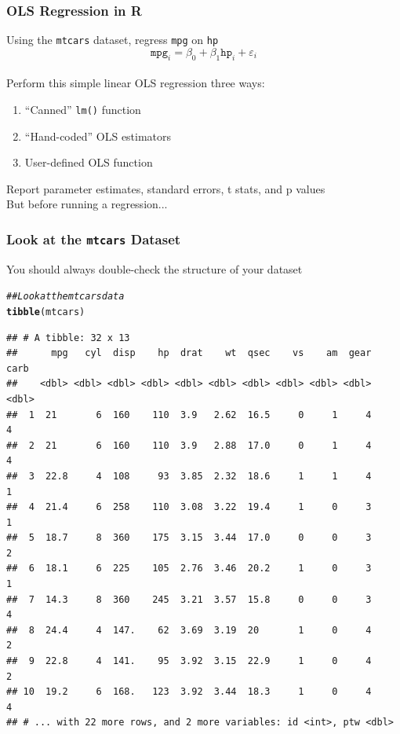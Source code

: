 \documentclass{beamer}\usepackage[]{graphicx}\usepackage[]{xcolor}
\makeatletter
\newcommand{\hlcom}[1]{\textcolor[rgb]{0.678,0.584,0.686}{\textit{#1}}}%
\newcommand{\hlstd}[1]{\textcolor[rgb]{0.345,0.345,0.345}{#1}}%
\newcommand{\hlkwd}[1]{\textcolor[rgb]{0.737,0.353,0.396}{\textbf{#1}}}%
\newenvironment{kframe}{%
 \def\at@end@of@kframe{}%
 \ifinner\ifhmode%
  \def\at@end@of@kframe{\end{minipage}}%
  \begin{minipage}{\columnwidth}%
 \fi\fi%
 \def\FrameCommand##1{\hskip\@totalleftmargin \hskip-\fboxsep
 \colorbox{shadecolor}{##1}\hskip-\fboxsep
     \hskip-\linewidth \hskip-\@totalleftmargin \hskip\columnwidth}%
 \MakeFramed {\advance\hsize-\width
   \@totalleftmargin\z@ \linewidth\hsize
   \@setminipage}}%
 {\par\unskip\endMakeFramed%
 \at@end@of@kframe}
\newenvironment{knitrout}{}{} %
\makeatother
\begin{document}
\begin{frame}\frametitle{OLS Regression in R}
    Using the \texttt{mtcars} dataset, regress \texttt{mpg} on \texttt{hp}
    $$\texttt{mpg}_i = \beta_0 + \beta_1 \texttt{hp}_i + \varepsilon_i$$ \\
    \vspace{2ex}
    Perform this simple linear OLS regression three ways:
    \begin{enumerate}
        \item ``Canned'' \texttt{lm()} function
        \item ``Hand-coded'' OLS estimators
        \item User-defined OLS function 
    \end{enumerate}
    \vspace{2ex}
    Report parameter estimates, standard errors, t stats, and p values \\
    \vspace{2ex}
    But before running a regression...
\end{frame}

\begin{frame}[fragile]\frametitle{Look at the \texttt{mtcars} Dataset}
    You should always double-check the structure of your dataset
\begin{knitrout}\footnotesize
{}\color{fgcolor}\begin{kframe}
\begin{alltt}
\hlcom{## Look at the mtcars data}
\hlkwd{tibble}\hlstd{(mtcars)}
\end{alltt}
\begin{verbatim}
## # A tibble: 32 x 13
##      mpg   cyl  disp    hp  drat    wt  qsec    vs    am  gear  carb
##    <dbl> <dbl> <dbl> <dbl> <dbl> <dbl> <dbl> <dbl> <dbl> <dbl> <dbl>
##  1  21       6  160    110  3.9   2.62  16.5     0     1     4     4
##  2  21       6  160    110  3.9   2.88  17.0     0     1     4     4
##  3  22.8     4  108     93  3.85  2.32  18.6     1     1     4     1
##  4  21.4     6  258    110  3.08  3.22  19.4     1     0     3     1
##  5  18.7     8  360    175  3.15  3.44  17.0     0     0     3     2
##  6  18.1     6  225    105  2.76  3.46  20.2     1     0     3     1
##  7  14.3     8  360    245  3.21  3.57  15.8     0     0     3     4
##  8  24.4     4  147.    62  3.69  3.19  20       1     0     4     2
##  9  22.8     4  141.    95  3.92  3.15  22.9     1     0     4     2
## 10  19.2     6  168.   123  3.92  3.44  18.3     1     0     4     4
## # ... with 22 more rows, and 2 more variables: id <int>, ptw <dbl>
\end{verbatim}
\end{kframe}
\end{knitrout}
\end{frame}
\end{document}
